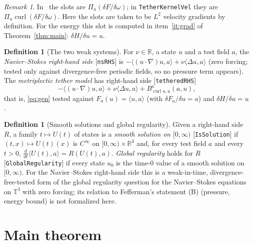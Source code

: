 \documentclass[11pt,a4paper]{article}
\theoremstyle{definition}
\newtheorem{definition}[theorem]{Definition}
\theoremstyle{remark}
\newtheorem{remark}[theorem]{Remark}
\newcommand{\T}{\mathbb{T}^3}
\newcommand{\R}{\mathbb{R}}
\newcommand{\ip}[2]{\langle #1,#2\rangle}
\newcommand{\lean}[1]{\texttt{#1}}
\begin{document}
\begin{remark}
In~\cite{Fr21856430} the slots are $\Pi_u(\delta F/\delta\omega)$; in \lean{TetherKernelVel} they
are $\Pi_u\operatorname{curl}(\delta F/\delta\omega)$. Here the slots are taken to be $L^2$
velocity gradients by definition. For the energy this slot is computed in item~\ref{it:grad}
of Theorem~\ref{thm:main}: $\delta H/\delta u=u$.
\end{remark}

\begin{definition}[The two weak systems]\label{def:systems}
For $\nu\in\R$, a state $u$ and a test field $a$, the \emph{Navier--Stokes right-hand side}
[\lean{nsRHS}] is $-\ip{(u\cdot\nabla)u}{a}+\nu\ip{\Delta u}{a}$ (zero forcing; tested only
against divergence-free periodic fields, so no pressure term appears). The \emph{metriplectic
tether model} has right-hand side [\lean{tetheredRHS}]
\[
-\ip{(u\cdot\nabla)u}{a}+\nu\ip{\Delta u}{a}+B^\kappa_{\operatorname{curl}u,u}(a,u),
\]
that is, \eqref{eq:gen} tested against $F_a(u)=\ip ua$ (with $\delta F_a/\delta u=a$) and
$\delta H/\delta u=u$.
\end{definition}

\begin{definition}[Smooth solutions and global regularity]\label{def:sol}
Given a right-hand side $R$, a family $t\mapsto U(t)$ of states is a \emph{smooth solution on
$[0,\infty)$} [\lean{IsSolution}] if $(t,x)\mapsto U(t)(x)$ is $C^\infty$ on $[0,\infty)\times\R^3$
and, for every test field $a$ and every $t>0$, $\frac{d}{dt}\ip{U(t)}{a}=R(U(t),a)$.
\emph{Global regularity} holds for $R$ [\lean{GlobalRegularity}] if every state $u_0$ is the
time-$0$ value of a smooth solution on $[0,\infty)$. For the Navier--Stokes right-hand side this is
a weak-in-time, divergence-free-tested form of the global regularity question for the
Navier--Stokes equations on $\T$ with zero forcing; its relation to Fefferman's statement (B)
\cite{Fefferman} (pressure, energy bound) is not formalized here.
\end{definition}

\section{Main theorem}


\end{document}
